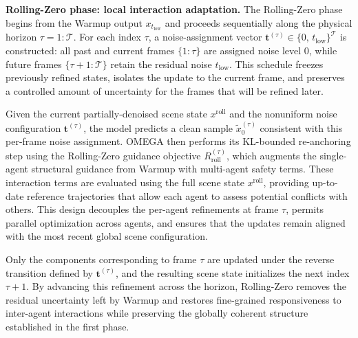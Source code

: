 \documentclass[10pt,twocolumn,letterpaper]{article}
\theoremstyle{plain}
\theoremstyle{remark}
\renewcommand{\paragraph}[1]{\vspace{.5em}\noindent\textbf{#1.}}
\begin{document}
\paragraph{Rolling-Zero phase: local interaction adaptation}
The Rolling-Zero phase begins from the Warmup output
$x_{t_{\mathrm{low}}}$ and proceeds sequentially along the
physical horizon $\tau = 1{:}\mathcal{T}$.  
For each index $\tau$, a noise-assignment vector
$\mathbf{t}^{(\tau)} \in \{0,\, t_{\mathrm{low}}\}^{\mathcal{T}}$
is constructed: all past and current frames $\{1{:}\tau\}$ are
assigned noise level $0$, while future frames
$\{\tau{+}1{:}\mathcal{T}\}$ retain the residual noise
$t_{\mathrm{low}}$.  
This schedule freezes previously refined states, isolates the
update to the current frame, and preserves a controlled amount of
uncertainty for the frames that will be refined later.

Given the current partially-denoised scene state $x^{\mathrm{roll}}$ and the
nonuniform noise configuration $\mathbf{t}^{(\tau)}$, the model
predicts a clean sample $\tilde{x}_0^{(\tau)}$ consistent with
this per-frame noise assignment.  
OMEGA then performs its KL-bounded re-anchoring step using the
Rolling-Zero guidance objective $R_{\mathrm{roll}}^{(\tau)}$,
which augments the single-agent structural guidance from Warmup
with multi-agent safety terms.  
These interaction terms are evaluated using the full scene state
$x^{\mathrm{roll}}$, providing up-to-date reference trajectories
that allow each agent to assess potential conflicts with others.  
This design decouples the per-agent refinements at frame $\tau$,
permits parallel optimization across agents, and ensures that the
updates remain aligned with the most recent global scene
configuration.

Only the components corresponding to frame $\tau$ are updated
under the reverse transition defined by $\mathbf{t}^{(\tau)}$,
and the resulting scene state initializes the next index
$\tau{+}1$.
By advancing this refinement across the horizon, Rolling-Zero
removes the residual uncertainty left by Warmup and restores
fine-grained responsiveness to inter-agent interactions while
preserving the globally coherent structure established in the
first phase.
\end{document}
